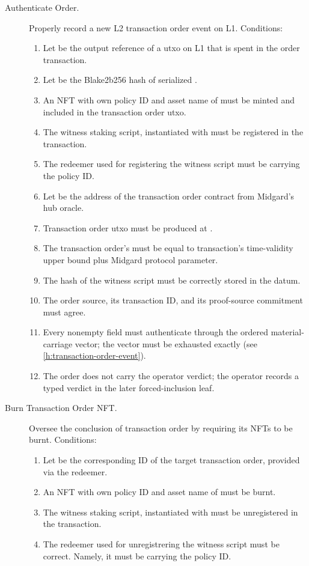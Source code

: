 \documentclass[../midgard.tex]{subfiles}
\begin{document}
\begin{description}
  \item[Authenticate Order.] Properly record a new L2 transaction order event on L1.
    Conditions:
      \begin{enumerate}
        \item Let  be the output reference of a utxo on L1 that is spent in the order transaction.
        \item Let  be the Blake2b256 hash of serialized .
        \item An NFT with own policy ID and asset name of  must be minted and included in the transaction order utxo.
        \item The witness staking script, instantiated with  must be registered in the transaction.
        \item The redeemer used for registering the witness script must be  carrying the  policy ID.
        \item Let  be the address of the transaction order contract from Midgard's hub oracle.
        \item Transaction order utxo must be produced at .
        \item The transaction order's  must be equal to transaction's time-validity upper bound plus  Midgard protocol parameter.
        \item The hash of the witness script must be correctly stored in the datum.
        \item The order source, its transaction ID, and its proof-source commitment must agree.
        \item Every nonempty field must authenticate through the ordered material-carriage vector; the vector must be exhausted exactly (see \cref{h:transaction-order-event}).
        \item The order does not carry the operator verdict; the operator records a typed verdict in the later forced-inclusion leaf.
      \end{enumerate}
    \item[Burn Transaction Order NFT.] Oversee the conclusion of transaction order by requiring its NFTs to be burnt.
    Conditions:
      \begin{enumerate}
        \item Let  be the corresponding ID of the target transaction order, provided via the redeemer.
        \item An NFT with own policy ID and asset name of  must be burnt.
        \item The witness staking script, instantiated with  must be unregistered in the transaction.
        \item The redeemer used for unregistrering the witness script must be correct.
          Namely, it must be  carrying the  policy ID.
      \end{enumerate}
\end{description}
\end{document}
